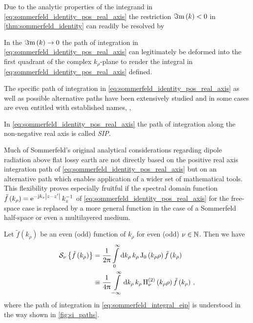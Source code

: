 Due to the analytic properties of the integrand in
\eqref{eq:sommerfeld_identity_pos_real_axis} the restriction $\Im\mathrm{m}\left(k\right) < 0$
in \cref{thm:sommerfeld_identity} can readily be resolved by
\begin{corollary}
	In the $\Im\mathrm{m}\left(k\right) \to 0$ the path of integration in
	\eqref{eq:sommerfeld_identity_pos_real_axis} can legitimately be deformed
	into the first quadrant of the complex $k_\rho$-plane to render the integral
	in \eqref{eq:sommerfeld_identity_pos_real_axis} defined.
\end{corollary}

The specific path of integration in \eqref{eq:sommerfeld_identity_pos_real_axis}
as well as possible alternative paths have been extensively studied and in some
cases are even entitled with established names, \eg,
\begin{definition}
	In \eqref{eq:sommerfeld_identity_pos_real_axis} the path of integration
	along the non-negative real axis is called \emph{\acf{SIP}}.
\end{definition}

Much of Sommerfeld's original analytical considerations
\cite{Sommerfeld1909,Sommerfeld1926} regarding dipole radiation above flat
lossy earth are not directly based on the positive real axis integration path
of \eqref{eq:sommerfeld_identity_pos_real_axis} but on an alternative path
which enables application of a wider set of mathematical tools.
This flexibility proves especially fruitful if the spectral domain function
$\tilde{f} \left(k_\rho\right) = \mathrm{e}^{-\mathrm{j} k_z \left\vert z - z^\prime\right\vert}\, k_z^{-1}$ of
\eqref{eq:sommerfeld_identity_pos_real_axis} for the free-space case is replaced
by a more general function in the case of a Sommerfeld half-space or even a
multilayered medium.
\begin{corollary}
	Let $\tilde{f} \left(k_\rho\right)$ be an even (odd) function of $k_\rho$
	for even (odd) $\nu \in \mathbb{N}$.
	Then we have
	\begin{align}
		\mathcal{S}_{\nu} \left\{\tilde{f} \left( k_\rho \right) \right\}
		&=
		\frac{1}{2\uppi}
		\int\limits_{0}^{\infty} \mathrm{d} k_\rho \, k_\rho
		\operatorname{J}_{0} \left(k_\rho \rho\right)
		\tilde{f} \left(k_\rho\right) 
		\label{eq:sommerfeld_integral_sip}
		\\
		&\equiv
		\frac{1}{4\uppi}
		\int\limits_{-\infty}^{\infty} \mathrm{d} k_\rho \, k_\rho
		\operatorname{H}_{\nu}^{\left( 2 \right)} \left(k_\rho \rho\right)
		\tilde{f} \left(k_\rho\right)
		\label{eq:sommerfeld_integral_eip}
		\, ,
	\end{align}
	where the path of integration in \eqref{eq:sommerfeld_integral_eip} is
	understood in the way shown in \cref{fig:si_paths}.
\end{corollary}

